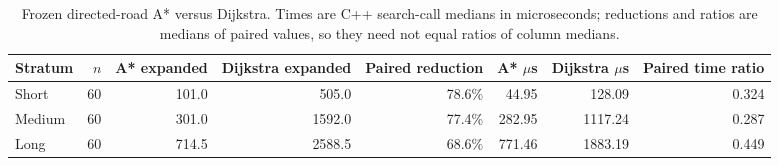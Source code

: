 \begin{table}[t]
\centering
\caption{Frozen directed-road A* versus Dijkstra. Times are C++ search-call medians in microseconds; reductions and ratios are medians of paired values, so they need not equal ratios of column medians.}
\label{tab:road-final}
\begin{tabular}{lrrrrrrr}
\hline
Stratum & $n$ & A* expanded & Dijkstra expanded & Paired reduction & A* $\mu$s & Dijkstra $\mu$s & Paired time ratio \\
\hline
Short & 60 & 101.0 & 505.0 & 78.6\% & 44.95 & 128.09 & 0.324 \\
Medium & 60 & 301.0 & 1592.0 & 77.4\% & 282.95 & 1117.24 & 0.287 \\
Long & 60 & 714.5 & 2588.5 & 68.6\% & 771.46 & 1883.19 & 0.449 \\
\hline
\end{tabular}
\end{table}
